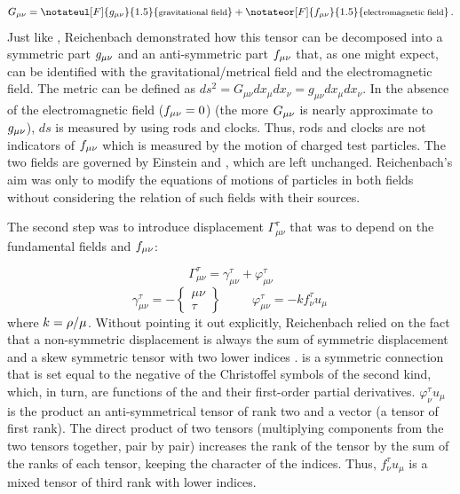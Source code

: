 \documentclass[submitted]{article}
\newcommand{\texts}[1]{\text{\footnotesize{#1}}}
\newcommand{\faradaymn}{\ensuremath{f\mn}}
\newcommand{\ctmrd}{\ensuremath{\hfrac{\rho}{\mu}}\xspace}
\begin{document}
\begin{equation}
\label{eq:ft} 
G_{\mu\nu}=\notateul[F]{g_{\mu\nu}}{1.5}{\texts{gravitational field}}+\notateor[F]{f_{\mu\nu}}{1.5}{\texts{electromagnetic field}}\,.
\end{equation}
%
Just like \citet{Eddington1921}, Reichenbach demonstrated how this tensor can be decomposed into a symmetric part $g_{\mu\nu}$ and an anti-symmetric part $f_{\mu\nu}$ that, as one might expect, can be identified with the gravitational/metrical field and the electromagnetic field. The metric can be defined as $d s^2=G_{\mu\nu}d x_\mu d x_\nu= g_{\mu\nu}d x_\mu d x_\nu$. In the absence of the electromagnetic field ($f_{\mu\nu}=0$) (the more $G_{\mu\nu}$ is nearly approximate to $g_{\mu\nu}$), $ds$ is measured by using rods and clocks. Thus, rods and clocks are not indicators of $f_{\mu\nu}$ which is measured by the motion of charged test particles. The two fields are governed by Einstein and \ME, which are left unchanged. Reichenbach's aim was only to modify the equations of motions of particles in both fields without considering the relation of such fields with their sources. 

The second step was to introduce displacement $\Gamma_{\mu\nu}^{\tau}$ that was to depend on the fundamental fields \gmn and \faradaymn:

\begin{equation}
\label{eq:ds}
\Gamma_{\mu\nu}^{\tau}=\gamma_{\mu\nu}^{\tau}+\varphi_{\mu\nu}^{\tau}
\end{equation}
%
\begin{equation}
\label{eq:dsd}
\gamma^\tau_{\mu\nu}=-\begin{Bmatrix} \mu\nu \\ \tau \end{Bmatrix} \;\;\;\;\;\;\;\;\; \varphi^{\tau}_{\mu\nu}=-k f^\tau_\nu u_\mu\,
\end{equation}
%
where $k=\ctmrd$. Without pointing it out explicitly, Reichenbach relied on the fact that a non-symmetric displacement is always the sum of symmetric displacement and a skew symmetric tensor with two lower indices \citep[see][851]{Schouten1924}. \gtmn is a symmetric connection that is set equal to the negative of the Christoffel symbols of the second kind, which, in turn, are functions of the \gmn and their first-order partial derivatives. $\varphi^\tau_\nu u_\mu$ is the product an anti-symmetrical tensor of rank two and a vector (a tensor of first rank). The direct product of two tensors (multiplying components from the two tensors together, pair by pair) increases the rank of the tensor by the sum of the ranks of each tensor, keeping the character of the indices. Thus, $f^\tau_\nu u_\mu$ is a mixed tensor of third rank with lower indices.
\end{document}
